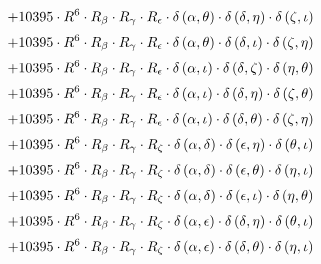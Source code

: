 \begin{subequations}
\begin{gather}
 \\[0.2em] \notag 		 + 10395 \cdot R^{6} \cdot R_{\beta{}} \cdot R_{\gamma{}} \cdot R_{\epsilon{}} \cdot \delta{}\left(\alpha{}, \theta{}\right) \cdot \delta{}\left(\delta{}, \eta{}\right) \cdot \delta{}\left(\zeta{}, \iota{}\right) 
 \\[0.2em] \notag 		 + 10395 \cdot R^{6} \cdot R_{\beta{}} \cdot R_{\gamma{}} \cdot R_{\epsilon{}} \cdot \delta{}\left(\alpha{}, \theta{}\right) \cdot \delta{}\left(\delta{}, \iota{}\right) \cdot \delta{}\left(\zeta{}, \eta{}\right) 
 \\[0.2em] \notag 		 + 10395 \cdot R^{6} \cdot R_{\beta{}} \cdot R_{\gamma{}} \cdot R_{\epsilon{}} \cdot \delta{}\left(\alpha{}, \iota{}\right) \cdot \delta{}\left(\delta{}, \zeta{}\right) \cdot \delta{}\left(\eta{}, \theta{}\right) 
 \\[0.2em] \notag 		 + 10395 \cdot R^{6} \cdot R_{\beta{}} \cdot R_{\gamma{}} \cdot R_{\epsilon{}} \cdot \delta{}\left(\alpha{}, \iota{}\right) \cdot \delta{}\left(\delta{}, \eta{}\right) \cdot \delta{}\left(\zeta{}, \theta{}\right) 
 \\[0.2em] \notag 		 + 10395 \cdot R^{6} \cdot R_{\beta{}} \cdot R_{\gamma{}} \cdot R_{\epsilon{}} \cdot \delta{}\left(\alpha{}, \iota{}\right) \cdot \delta{}\left(\delta{}, \theta{}\right) \cdot \delta{}\left(\zeta{}, \eta{}\right) 
 \\[0.2em] \notag 		 + 10395 \cdot R^{6} \cdot R_{\beta{}} \cdot R_{\gamma{}} \cdot R_{\zeta{}} \cdot \delta{}\left(\alpha{}, \delta{}\right) \cdot \delta{}\left(\epsilon{}, \eta{}\right) \cdot \delta{}\left(\theta{}, \iota{}\right) 
 \\[0.2em] \notag 		 + 10395 \cdot R^{6} \cdot R_{\beta{}} \cdot R_{\gamma{}} \cdot R_{\zeta{}} \cdot \delta{}\left(\alpha{}, \delta{}\right) \cdot \delta{}\left(\epsilon{}, \theta{}\right) \cdot \delta{}\left(\eta{}, \iota{}\right) 
 \\[0.2em] \notag 		 + 10395 \cdot R^{6} \cdot R_{\beta{}} \cdot R_{\gamma{}} \cdot R_{\zeta{}} \cdot \delta{}\left(\alpha{}, \delta{}\right) \cdot \delta{}\left(\epsilon{}, \iota{}\right) \cdot \delta{}\left(\eta{}, \theta{}\right) 
 \\[0.2em] \notag 		 + 10395 \cdot R^{6} \cdot R_{\beta{}} \cdot R_{\gamma{}} \cdot R_{\zeta{}} \cdot \delta{}\left(\alpha{}, \epsilon{}\right) \cdot \delta{}\left(\delta{}, \eta{}\right) \cdot \delta{}\left(\theta{}, \iota{}\right) 
 \\[0.2em] \notag 		 + 10395 \cdot R^{6} \cdot R_{\beta{}} \cdot R_{\gamma{}} \cdot R_{\zeta{}} \cdot \delta{}\left(\alpha{}, \epsilon{}\right) \cdot \delta{}\left(\delta{}, \theta{}\right) \cdot \delta{}\left(\eta{}, \iota{}\right) 

\end{gather}
\end{subequations}
